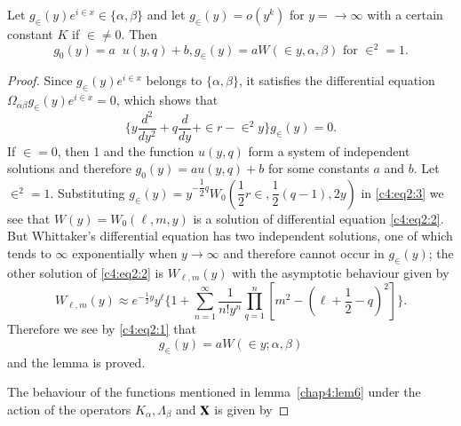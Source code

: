 \setcounter{lem}{5}

\begin{lem}\label{chap4:lem6}
Let $g_{\in}(y)e^{i\in x} \in \{\alpha,
\beta\}$ and let $g_{\in}(y)=o(y^k)$ for $y=\to \infty$ with a
certain constant $K$ if $\in \neq 0$. Then
$$
g_0(y) = a \;\;  u (y,q) + b, g_{\in} (y) = a W (\in y,
\alpha, \beta) \text{ for } \in^2=1. 
$$
\end{lem}

\begin{proof}
Since $g_{\in}(y)e^{i\in x}$ belongs to $\{\alpha,
\beta\}$, it satisfies the differential equation $\Omega_{\alpha
  \beta} g_{\in}(y)e^{i\in x}=0$, which shows that
\begin{equation*}
\{y\frac{d^2}{dy^2} + q \frac{d}{dy} + \in r - \in^2 y
\} g_{\in} (y) =0. \tag{3}\label{c4:eq2:3}
\end{equation*}
If $\in =0$, then 1 and the function $u(y,q)$ form a system of
independent solutions and therefore $g_0(y)=au(y,q)+b$ for some
constants $a$ and $b$. Let \pageoriginale $\in^2 = 1$. Substituting
$g_{\in}(y) = y^{-\dfrac{1}{2}q}W_0(\dfrac{1}{2}r\in,
\dfrac{1}{2}(q-1), 2y)$ in \eqref{c4:eq2:3} we see that $W(y)=W_0(\ell,m,y)$ is a
solution of differential equation \eqref{c4:eq2:2}. But Whittaker's differential
equation has two independent solutions, one of which tends to $\infty$
exponentially when $y\to\infty$ and therefore cannot occur in
$g_{\in}(y)$; the other solution of \eqref{c4:eq2:2} is $W_{\ell,m}(y)$
with the asymptotic behaviour given by
\begin{equation*}
W_{\ell,m}(y) \approx e^{-\frac{1}{2}y} y^{\ell}
\{1+\sum^{\infty}_{n=1} \frac{1}{n!y^n} \prod^n_{q=1} [m^2-(\ell
  +\frac{1}{2}-q)^2]\}. \tag{5}\label{c4:eq2:5}
\end{equation*}
Therefore we see by \eqref{c4:eq2:1} that
$$
g_{\in}(y) = aW(\in y ; \alpha , \beta)
$$
and the lemma is proved.

The behaviour of the functions mentioned in 
lemma~\ref{chap4:lem6} under the action of the 
operators $K_{\alpha},\Lambda_{\beta}$ and $\mathbf{X}$ is given by
\end{proof}

